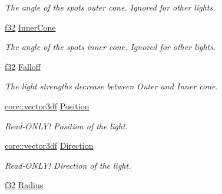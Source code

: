 \begin{DoxyCompactItemize}
\begin{DoxyCompactList}\small\item\em The angle of the spot\textquotesingle{}s outer cone. Ignored for other lights. \end{DoxyCompactList}\item 
\hyperlink{namespaceirr_a0277be98d67dc26ff93b1a6a1d086b07}{f32} \hyperlink{structirr_1_1video_1_1SLight_ab079c170fbab1e0a191e8801839d6c83}{Inner\+Cone}\hypertarget{structirr_1_1video_1_1SLight_ab079c170fbab1e0a191e8801839d6c83}{}\label{structirr_1_1video_1_1SLight_ab079c170fbab1e0a191e8801839d6c83}

\begin{DoxyCompactList}\small\item\em The angle of the spot\textquotesingle{}s inner cone. Ignored for other lights. \end{DoxyCompactList}\item 
\hyperlink{namespaceirr_a0277be98d67dc26ff93b1a6a1d086b07}{f32} \hyperlink{structirr_1_1video_1_1SLight_a38cea8db5e6951a9d98802f2f249129d}{Falloff}\hypertarget{structirr_1_1video_1_1SLight_a38cea8db5e6951a9d98802f2f249129d}{}\label{structirr_1_1video_1_1SLight_a38cea8db5e6951a9d98802f2f249129d}

\begin{DoxyCompactList}\small\item\em The light strength\textquotesingle{}s decrease between Outer and Inner cone. \end{DoxyCompactList}\item 
\hyperlink{namespaceirr_1_1core_a06f169d08b5c429f5575acb7edbad811}{core\+::vector3df} \hyperlink{structirr_1_1video_1_1SLight_ac1f0fda0cc1780b09a2597adcfc9c946}{Position}
\begin{DoxyCompactList}\small\item\em Read-\/\+O\+N\+L\+Y! Position of the light. \end{DoxyCompactList}\item 
\hyperlink{namespaceirr_1_1core_a06f169d08b5c429f5575acb7edbad811}{core\+::vector3df} \hyperlink{structirr_1_1video_1_1SLight_a226c488abec5696b995df6895ab42d41}{Direction}
\begin{DoxyCompactList}\small\item\em Read-\/\+O\+N\+L\+Y! Direction of the light. \end{DoxyCompactList}\item 
\hyperlink{namespaceirr_a0277be98d67dc26ff93b1a6a1d086b07}{f32} \hyperlink{structirr_1_1video_1_1SLight_a9f3fbdf2869d9beca604ba1cca7499cb}{Radius}\hypertarget{structirr_1_1video_1_1SLight_a9f3fbdf2869d9beca604ba1cca7499cb}{}\label{structirr_1_1video_1_1SLight_a9f3fbdf2869d9beca604ba1cca7499cb}


\end{DoxyCompactItemize}
